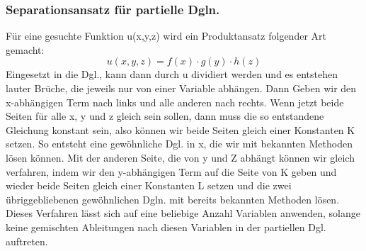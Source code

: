 \documentclass[
	11pt, %
]{beamer}
\begin{document}
\begin{frame}
	\frametitle{Separationsansatz f\"ur partielle Dgln.}
	F\"ur eine gesuchte Funktion u(x,y,z) wird ein Produktansatz folgender Art gemacht:
		\begin{equation}
			u(x,y,z) = f(x)\cdot g(y)\cdot h(z)
		\end{equation}
		Eingesetzt in die Dgl., kann dann durch u dividiert werden und es entstehen lauter Br\"uche, die jeweils nur von einer Variable abh\"angen. Dann Geben wir den x-abh\"angigen Term nach links und alle anderen nach rechts. Wenn jetzt beide Seiten f\"ur alle x, y und z gleich sein sollen, dann muss die so entstandene Gleichung konstant sein, also k\"onnen wir beide Seiten gleich einer Konstanten K setzen. So entsteht eine gew\"ohnliche Dgl. in x, die wir mit bekannten Methoden l\"osen k\"onnen. Mit der anderen Seite, die von y und Z abh\"angt k\"onnen wir gleich verfahren, indem wir den y-abh\"angigen Term auf die Seite von K geben und wieder beide Seiten gleich einer Konstanten L setzen und die zwei \"ubriggebliebenen gew\"ohnlichen Dgln. mit bereits bekannten Methoden l\"osen. Dieses Verfahren l\"asst sich auf eine beliebige Anzahl Variablen anwenden, solange keine gemischten Ableitungen nach diesen Variablen in der partiellen Dgl. auftreten.
\end{frame}
\end{document}
